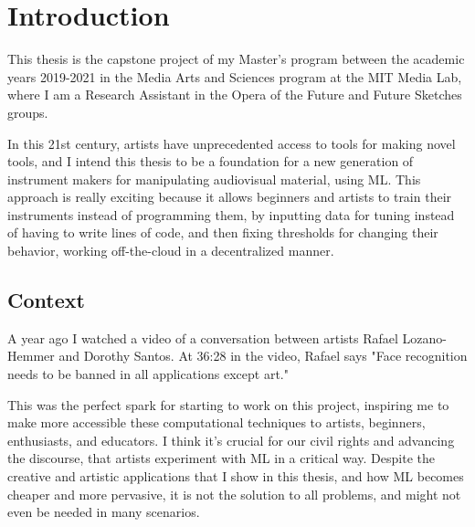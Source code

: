 \chapter{Introduction}

This thesis is the capstone project of my Master's program between the academic years 2019-2021 in the Media Arts and Sciences program at the MIT Media Lab, where I am a Research Assistant in the Opera of the Future and Future Sketches groups.

In this 21st century, artists have unprecedented access to tools for making novel tools, and I intend this thesis to be a foundation for a new generation of instrument makers for manipulating audiovisual material, using \acrshort{ML}. This approach is really exciting because it allows beginners and artists to train their instruments instead of programming them, by inputting data for tuning instead of having to write lines of code, and then fixing thresholds for changing their behavior, working off-the-cloud in a decentralized manner.

\section{Context}

A year ago I watched a video \cite{website-talk-technology-and-public-art-rafael-lozano-hemmer} of a conversation between artists Rafael Lozano-Hemmer and Dorothy Santos. At 36:28 in the video, Rafael says "Face recognition needs to be banned in all applications except art."

This was the perfect spark for starting to work on this project, inspiring me to make more accessible these computational techniques to artists, beginners, enthusiasts, and educators. I think it's crucial for our civil rights and advancing the discourse, that artists experiment with \acrshort{ML} in a critical way. Despite the creative and artistic applications that I show in this thesis, and how \acrshort{ML} becomes cheaper and more pervasive, it is not the solution to all problems, and might not even be needed in many scenarios.

